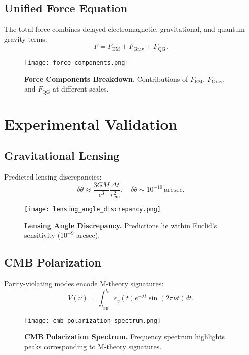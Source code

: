 \documentclass[12pt, a4paper]{article}
\begin{document}
\subsection*{Unified Force Equation}

The total force combines delayed electromagnetic, gravitational, and quantum gravity terms:
\[
F = F_{\text{EM}} + F_{\text{Grav}} + F_{\text{QG}}.
\]

\begin{figure}[h]
\centering
\texttt{[image: force\_components.png]}
\caption{\textbf{Force Components Breakdown.} Contributions of \(F_{\text{EM}}\), \(F_{\text{Grav}}\), and \(F_{\text{QG}}\) at different scales.}
\label{fig:force}
\end{figure}

\section*{Experimental Validation}

\subsection*{Gravitational Lensing}

Predicted lensing discrepancies:
\[
\delta \theta \approx \frac{3GM}{c^3} \frac{\Delta t}{r_{\text{em}}^2}, \quad \delta \theta \sim 10^{-10} \, \text{arcsec}.
\]

\begin{figure}[h]
\centering
\texttt{[image: lensing\_angle\_discrepancy.png]}
\caption{\textbf{Lensing Angle Discrepancy.} Predictions lie within Euclid's sensitivity (\(10^{-9}\) arcsec).}
\label{fig:lensing}
\end{figure}

\subsection*{CMB Polarization}

Parity-violating modes encode M-theory signatures:
\[
V(\nu) = \int_{t_{\text{BB}}}^{t_0} \epsilon_{\gamma}(t) e^{-\lambda t} \sin(2\pi \nu t) dt.
\]

\begin{figure}[h]
\centering
\texttt{[image: cmb\_polarization\_spectrum.png]}
\caption{\textbf{CMB Polarization Spectrum.} Frequency spectrum highlights peaks corresponding to M-theory signatures.}
\label{fig:polarization}
\end{figure}
\end{document}
